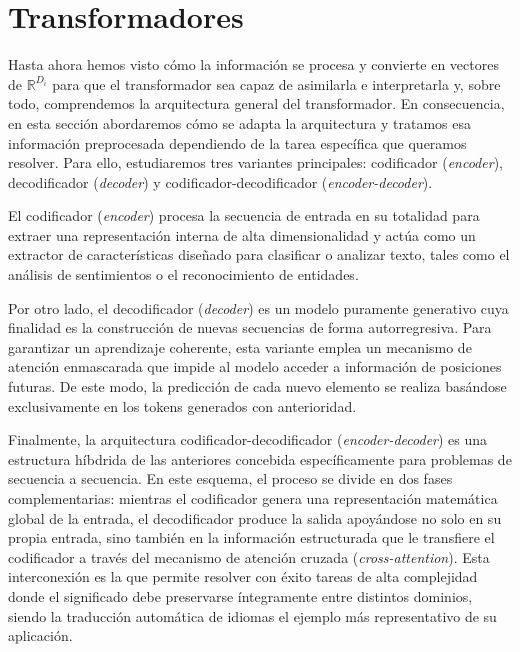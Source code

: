 \section{Transformadores}
Hasta ahora hemos visto cómo la información se procesa y convierte en vectores de $\mathbb{R}^{D_i}$  para que el transformador sea capaz de asimilarla e interpretarla y, sobre todo, comprendemos la arquitectura general del transformador. En consecuencia, en esta sección abordaremos cómo se adapta la arquitectura y tratamos esa información preprocesada dependiendo de la tarea específica que queramos resolver. Para ello, estudiaremos tres variantes principales: codificador (\textit{encoder}), decodificador (\textit{decoder}) y codificador-decodificador (\textit{encoder-decoder}).

El codificador (\textit{encoder}) procesa la secuencia de entrada en su totalidad para extraer una representación interna de alta dimensionalidad y actúa como un extractor de características diseñado para clasificar o analizar texto, tales como el análisis de sentimientos o el reconocimiento de entidades.

Por otro lado, el decodificador (\textit{decoder}) es un modelo puramente generativo cuya finalidad es la construcción de nuevas secuencias de forma autorregresiva. Para garantizar un aprendizaje coherente, esta variante emplea un mecanismo de atención enmascarada que impide al modelo acceder a información de posiciones futuras. De este modo, la predicción de cada nuevo elemento se realiza basándose exclusivamente en los tokens generados con anterioridad. 

Finalmente, la arquitectura  codificador-decodificador (\textit{encoder-decoder}) 
es una estructura híbdrida de las anteriores concebida específicamente para 
problemas de secuencia a secuencia. En este esquema, el proceso se divide en dos 
fases complementarias: mientras el codificador genera una representación matemática 
global de la entrada, el decodificador produce la salida apoyándose no solo en su 
propia entrada, sino también en la información estructurada que le transfiere el 
codificador a través del mecanismo de atención cruzada (\textit{cross-attention}).
Esta interconexión es la que permite resolver con éxito tareas de alta complejidad 
donde el significado debe preservarse íntegramente entre distintos dominios, siendo 
la traducción automática de idiomas el ejemplo más representativo de su aplicación.



